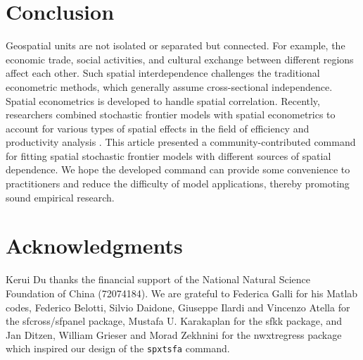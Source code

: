 \section{Conclusion}\label{sec_conclusion}

Geospatial units are not isolated or separated but connected. For example, the economic trade, social activities, and cultural exchange between different regions affect each other. Such spatial interdependence challenges the traditional econometric methods, which generally assume cross-sectional independence. Spatial econometrics is developed to handle spatial correlation. Recently, researchers combined stochastic frontier models with spatial econometrics to account for various types of spatial effects in the field of efficiency and productivity analysis \citep{galli2022spatial,orea2019new}.  This article presented a community-contributed command for fitting spatial stochastic frontier models with different sources of spatial dependence. We hope the developed command can provide some convenience to practitioners and reduce the difficulty of model applications, thereby promoting sound empirical research. 




\section{Acknowledgments}
Kerui Du thanks the financial support of the National Natural Science Foundation of China (72074184).  We are grateful to Federica Galli for his Matlab codes, Federico Belotti, Silvio Daidone, Giuseppe Ilardi and Vincenzo Atella for the sfcross/sfpanel package, Mustafa U. Karakaplan for the sfkk package, and Jan Ditzen, William Grieser and Morad Zekhnini for the nwxtregress package which inspired our design of the {\tt spxtsfa} command. 



\endinput
